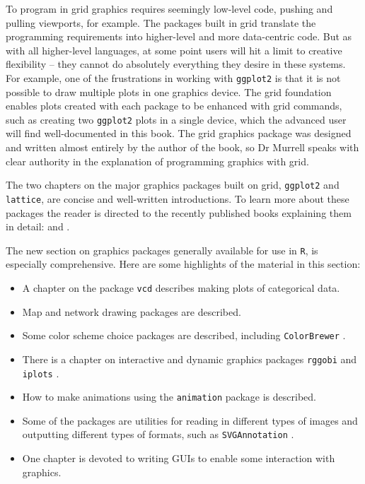 \documentclass[12pt]{article}
\begin{document}
To program in grid graphics requires seemingly low-level code,
pushing and pulling viewports, for example. The packages built in grid
translate the programming requirements into higher-level and more
data-centric code. But as with all higher-level languages, at some point users will hit a limit to creative
flexibility -- they cannot do absolutely everything they desire
in these systems. For example,
one of the frustrations in working with \texttt{ggplot2} is that it is not possible to draw multiple plots in 
one graphics device. The grid foundation enables plots created with each package to be enhanced
with grid commands, such as creating two \texttt{ggplot2} plots in a single device, which the advanced user will find well-documented in this book.   The grid graphics package was designed and
written almost entirely by the author of the book, so Dr Murrell
speaks with clear authority in the explanation of programming graphics
with grid.

The two chapters on the major graphics packages built on grid,
\texttt{ggplot2} and \texttt{lattice}, are concise and well-written
introductions. To learn more about these packages the reader is
directed to the recently published books explaining them in detail:
\citep{ggplot2} and \citep{sarkar2008}.

The new section on graphics packages generally available for use in \texttt{R}, is especially 
comprehensive. Here are some highlights of the material in this section:

\begin{itemize} \itemsep 0in
\item A chapter on the package \texttt{vcd} \citep{vcd} describes making
plots of categorical data. 
\item Map and network drawing packages are
described. 
\item Some color scheme choice packages are described, including
\texttt{ColorBrewer} \citep{ColorBrewer, RColorBrewer}. 
\item There is a chapter on interactive and dynamic
graphics packages \texttt{rggobi} \citep{rggobi} and \texttt{iplots} \citep{iplots}. 
\item How to make
animations using the \texttt{animation} \citep{animation} package is described. 
\item Some of the packages are utilities for reading in different
types of images and outputting different types of formats, such as
\texttt{SVGAnnotation} \citet{SVGAnnotation}. 
\item One chapter is devoted to writing GUIs to enable
some interaction with graphics.
\end{itemize}
\end{document}
